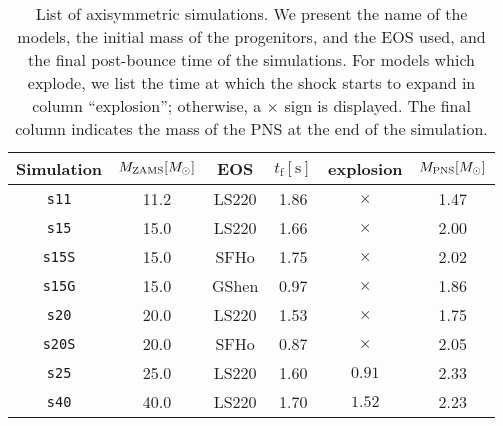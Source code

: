 \begin{table}
  \centering
  \begin{tabular}{c|cc|ccc}
    \hline
    Simulation & $M_\mathrm{ZAMS} [M_{\odot}]$ & EOS & $t_{\mathrm{f}} [\mathrm{s}]$&
    explosion & $M_{\mathrm{PNS}} [M_{\odot}]$
    \\ 
    \hline
    \texttt{s11} & 11.2 & LS220 & 1.86 & $\times$ &  1.47
    \\ 
    \texttt{s15} & 15.0 & LS220 & 1.66 & $\times$ &  2.00
    \\ 
    \texttt{s15S} & 15.0 & SFHo & 1.75 & $\times$ &  2.02
    \\ 
    \texttt{s15G} & 15.0 & GShen & 0.97 & $\times$ &  1.86
    \\ 
    \texttt{s20} & 20.0 & LS220 & 1.53 & $\times$ & 1.75
    \\ 
    \texttt{s20S} & 20.0 & SFHo & 0.87 & $\times$ & 2.05
    \\ 
    \texttt{s25} & 25.0 & LS220 & 1.60 & $0.91$ &  2.33
    \\ 
    \texttt{s40} & 40.0 & LS220 & 1.70 & $1.52$ &  2.23
    \\ \hline
  \end{tabular}
  \caption{%
    List of axisymmetric simulations.  We present the name of the models, the initial
    mass of the progenitors, and the EOS used, and the  final
    post-bounce time of the simulations.  For models which explode,
    we list the time at which the shock starts to expand in column
    ``explosion''; otherwise, a $\times$ sign is displayed.  The final
    column indicates the mass of the PNS at the end of the
    simulation.  
  }
  \label{Tab:2dSimList}
\end{table}

 	

